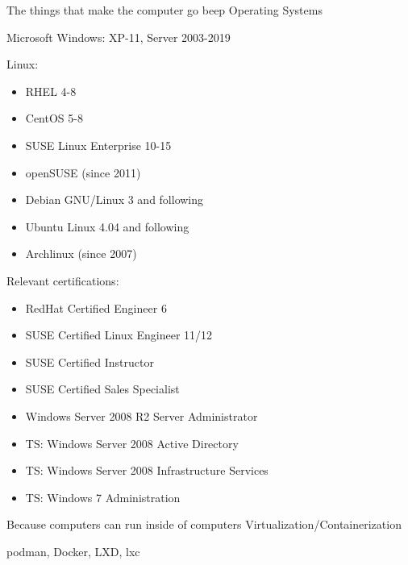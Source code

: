

\begin{cventries}
  \cventry
    {The things that make the computer go beep}
    {Operating Systems}
		{}
    {}
    {
			\begin{cvitems}
				\item Microsoft Windows: XP-11, Server 2003-2019
				\item Linux:
          \begin{itemize}
            \item RHEL 4-8
            \item CentOS 5-8
            \item SUSE Linux Enterprise 10-15
            \item openSUSE (since 2011)
            \item Debian GNU/Linux 3 and following
            \item Ubuntu Linux 4.04 and following
            \item Archlinux (since 2007)
          \end{itemize}
        \item Relevant certifications:
          \begin{itemize}
            \item RedHat Certified Engineer 6
            \item SUSE Certified Linux Engineer 11/12
            \item SUSE Certified Instructor
            \item SUSE Certified Sales Specialist
            \item Windows Server 2008 R2 Server Administrator
            \item TS: Windows Server 2008 Active Directory
            \item TS: Windows Server 2008 Infrastructure Services
            \item TS: Windows 7 Administration
          \end{itemize}
      \end{cvitems}
    }
  \cventry
    {Because computers can run inside of computers}
    {Virtualization/Containerization}
    {}
    {}
    {
      \begin{cvitems}
        \item podman, Docker, LXD, lxc

\end{cvitems}}
\end{cventries}
